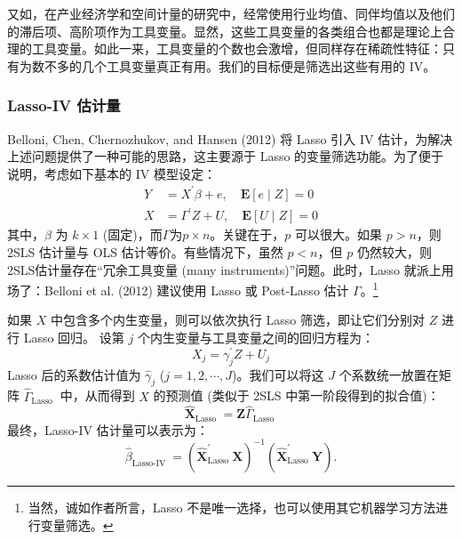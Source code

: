 {又如，在产业经济学和空间计量的研究中，经常使用行业均值、同伴均值以及他们的滞后项、高阶项作为工具变量。显然，这些工具变量的各类组合也都是理论上合理的工具变量。如此一来，工具变量的个数也会激增，但同样存在稀疏性特征：只有为数不多的几个工具变量真正有用。我们的目标便是筛选出这些有用的 IV。

\subsubsection{Lasso-IV 估计量}
Belloni, Chen, Chernozhukov, and Hansen (2012) 将 Lasso 引入 IV 估计，为解决上述问题提供了一种可能的思路，这主要源于 Lasso 的变量筛选功能。为了便于说明，考虑如下基本的 IV 模型设定：
\begin{equation}\label{eq:lasso-iv-01}
	\begin{aligned}
	Y &=X^{\prime} \beta+e,  \quad \mathbf{E}[e \mid Z] =0 \\
	X &=\Gamma^{\prime} Z+U, \quad \mathbf{E}[U \mid Z] =0
	\end{aligned}
\end{equation}
其中，$\beta$ 为 $k\times 1$ (固定)，而$\Gamma$为$p\times n$。关键在于，$p$ 可以很大。如果 $p>n$，则 2SLS 估计量与 OLS 估计等价。有些情况下，虽然 $p<n$，但 $p$ 仍然较大，则2SLS估计量存在“冗余工具变量 (many instruments)”问题。此时，Lasso 就派上用场了：Belloni et al. (2012) 建议使用 Lasso 或 Post-Lasso 估计 $\Gamma$。\footnote{%
   当然，诚如作者所言，Lasso 不是唯一选择，也可以使用其它机器学习方法进行变量筛选。}

如果 $X$ 中包含多个内生变量，则可以依次执行 Lasso 筛选，即让它们分别对 $Z$ 进行 Lasso 回归。
设第 $j$ 个内生变量与工具变量之间的回归方程为：
$$X_{j}=\gamma_{j}^{\prime}Z+U_{j}$$
Lasso 后的系数估计值为 $\widehat{\gamma}_{j}$ ($j=1,2,\cdots,J$)。我们可以将这 $J$ 个系数统一放置在矩阵 $\widehat{\Gamma}_{\text {Lasso }}$ 中，从而得到 $X$ 的预测值 (类似于 2SLS 中第一阶段得到的拟合值)：
$$\widehat{\boldsymbol{X}}_{\text {Lasso }}=\boldsymbol{Z} \widehat{\Gamma}_{\text {Lasso }}$$
最终，Lasso-IV 估计量可以表示为：
$$
\widehat{\beta}_{\text {Lasso-IV }}=\left(\widehat{\boldsymbol{X}}_{\text {Lasso }}^{\prime} \boldsymbol{X}\right)^{-1}\left(\widehat{\boldsymbol{X}}_{\text {Lasso }}^{\prime} \boldsymbol{Y}\right) .
$$

}
